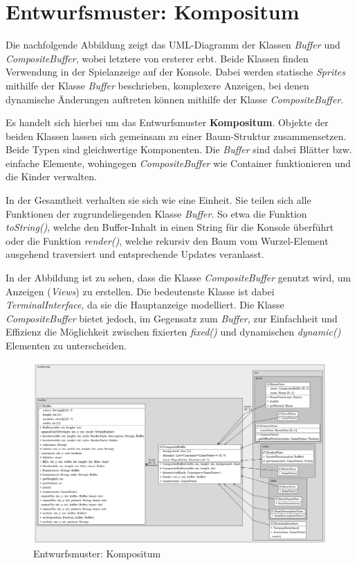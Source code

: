 \section{Entwurfsmuster: Kompositum}
Die nachfolgende Abbildung zeigt das UML-Diagramm der Klassen
\textit{Buffer} und \textit{CompositeBuffer}, wobei letztere von
ersterer erbt. Beide Klassen finden Verwendung in der Spielanzeige
auf der Konsole. Dabei werden statische \textit{Sprites} mithilfe
der Klasse \textit{Buffer} beschrieben, komplexere Anzeigen, bei denen
dynamische Änderungen auftreten können mithilfe der Klasse
\textit{CompositeBuffer}.

Es handelt sich hierbei um das Entwurfsmuster \textbf{Kompositum}. 
Objekte der beiden Klassen lassen sich gemeinsam zu einer Baum-Struktur
zusammensetzen. Beide Typen sind gleichwertige Komponenten. Die
\textit{Buffer} sind dabei Blätter bzw. einfache Elemente, wohingegen
\textit{CompositeBuffer} wie Container funktionieren und die Kinder
verwalten. 

In der Gesamtheit verhalten sie sich wie eine Einheit. Sie teilen sich
alle Funktionen der zugrundeliegenden Klasse \textit{Buffer}. So etwa
die Funktion \textit{toString()}, welche den Buffer-Inhalt in einen
String für die Konsole überführt oder die Funktion \textit{render()},
welche rekursiv den Baum vom Wurzel-Element ausgehend traversiert und
entsprechende Updates veranlasst.

In der Abbildung ist zu sehen, dass die Klasse
\textit{CompositeBuffer} genutzt wird, um Anzeigen (\textit{Views})
zu erstellen. Die bedeutenste Klasse ist dabei
\textit{TerminalInterface}, da sie die Hauptanzeige modelliert.
Die Klasse \textit{CompositeBuffer} bietet jedoch, im Gegensatz zum
\textit{Buffer}, zur Einfachheit und Effizienz die Möglichkeit
zwischen fixierten \textit{fixed()} und dynamischen \textit{dynamic()}
Elementen zu unterscheiden.

\vspace{0.5cm}
\begin{figure}[H]
    \centering
    \includegraphics[width=1\linewidth]{Bilder/Visualisierung/CompositeBuffer_structure.png}
    \caption{Entwurfsmuster: Kompositum}
\end{figure}